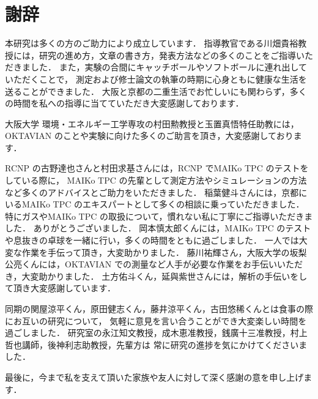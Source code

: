 \documentclass[../master]{subfiles}
\begin{document}
\chapter*{謝辞}
本研究は多くの方のご助力により成立しています．
指導教官である川畑貴裕教授には，研究の進め方，文章の書き方，発表方法などの多くのことをご指導いただきました．
また，実験の合間にキャッチボールやソフトボールに連れ出していただくことで，
測定および修士論文の執筆の時期に心身ともに健康な生活を送ることができました．
大阪と京都の二重生活でお忙しいにも関わらず，多くの時間を私への指導に当てていただき大変感謝しております．

大阪大学 環境・エネルギー工学専攻の村田勲教授と玉置真悟特任助教には，
OKTAVIAN のことや実験に向けた多くのご助言を頂き，大変感謝しております．

RCNP の古野達也さんと村田求基さんには，RCNP でMAIKo TPC のテストをしている際に，
MAIKo TPC の先輩として測定方法やシミュレーションの方法など多くのアドバイスとご助力をいただきました．
稲葉健斗さんには，京都にいるMAIKo TPC のエキスパートとして多くの相談に乗っていただきました．
特にガスやMAIKo TPC の取扱について，慣れない私に丁寧にご指導いただきました．
ありがとうございました．
岡本慎太郎くんには，MAIKo TPC のテストや息抜きの卓球を一緒に行い，多くの時間をともに過ごしました．
一人では大変な作業を手伝って頂き，大変助かりました．
藤川祐輝さん，大阪大学の坂梨公亮くんには，OKTAVIAN での測量など人手が必要な作業をお手伝いいただき，大変助かりました．
土方佑斗くん，延與紫世さんには，解析の手伝いをして頂き大変感謝しています．

同期の関屋涼平くん，原田健志くん，藤井涼平くん，古田悠稀くんとは食事の際にお互いの研究について，
気軽に意見を言い合うことができ大変楽しい時間を過ごしました．
研究室の永江知文教授，成木恵准教授，銭廣十三准教授，村上哲也講師，後神利志助教授，先輩方は
常に研究の進捗を気にかけてくださいました．

最後に，今まで私を支えて頂いた家族や友人に対して深く感謝の意を申し上げます．
\end{document}
